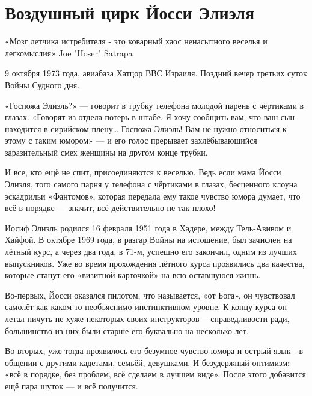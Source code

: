 
\chapter{ Воздушный цирк Йосси Элиэля}
\begin{remark}
	«Мозг летчика истребителя - это коварный хаос ненасытного веселья и легкомыслия»
	Joe "Hoser" Satrapa
\end{remark}

9 октября 1973 года, авиабаза Хатцор ВВС Израиля. Поздний вечер третьих суток Войны Судного дня.

«Госпожа Элиэль?» — говорит в трубку телефона молодой парень с чёртиками в глазах. «Говорят из отдела потерь в штабе. Я хочу сообщить вам, что ваш сын находится в сирийском плену… Госпожа Элиэль! Вам не нужно относиться к этому с таким юмором» — и его голос прерывает захлёбывающийся заразительный смех женщины на другом конце трубки.

И все, кто ещё не спит, присоединяются к веселью. Ведь если мама Йосси Элиэля, того самого парня у телефона с чёртиками в глазах, бесценного клоуна эскадрильи «Фантомов», которая передала ему такое чувство юмора думает, что всё в порядке — значит, всё действительно не так плохо!



Иосиф Элиэль родился 16 февраля 1951 года в Хадере, между Тель-Авивом и Хайфой. В октябре 1969 года, в разгар Войны на истощение, был зачислен на лётный курс, а через два года, в 71-м, успешно его закончил, одним из лучших выпускников. Уже во время прохождения лётного курса проявились два качества, которые станут его «визитной карточкой» на всю оставшуюся жизнь.

Во-первых, Йосси оказался пилотом, что называется, «от Бога», он чувствовал самолёт как каком-то необъяснимо-инстинктивном уровне. К концу курса он летал ничуть не хуже некоторых своих инструкторов— справедливости ради, большинство из них были старше его буквально на несколько лет.

Во-вторых, уже тогда проявилось его безумное чувство юмора и острый язык - в общении с другими кадетами, семьёй, девушками. И безудержный оптимизм: «всё в порядке, без проблем, всё сделаем в лучшем виде». После этого добавится ещё пара шуток — и всё получится.

